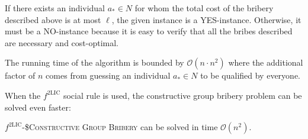 \documentclass[
    12pt,               %
    a4paper,            %
    bibtotoc,           %
    pointlessnumbers,   %
    ngerman,            %
    titlepage,          %
    leqno,              %
    ]{scrarticle}       %
\begin{document}
\begin{Proof}
If there exists an individual $a_\ast \in N$ for whom the total cost of the bribery described above is at most $\ell$, the given instance is a YES-instance. Otherwise, it must be a NO-instance because it is easy to verify that all the bribes described are necessary and cost-optimal.

The running time of the algorithm is bounded by $\mathcal{O}(n \cdot n^2)$ where the additional factor of $n$ comes from guessing an individual $a_\ast \in N$ to be qualified by everyone.
\end{Proof}



When the $f^{\text{2LIC}}$ social rule is used, the constructive group bribery problem can be solved even faster:

\begin{Theorem} \label{thm:2lic_cgb_p}
$f^{\text{2LIC}}$-\textsc{\$Constructive Group Bribery} can be solved in time $\mathcal{O}(n^2)$.
\end{Theorem}
\end{document}
